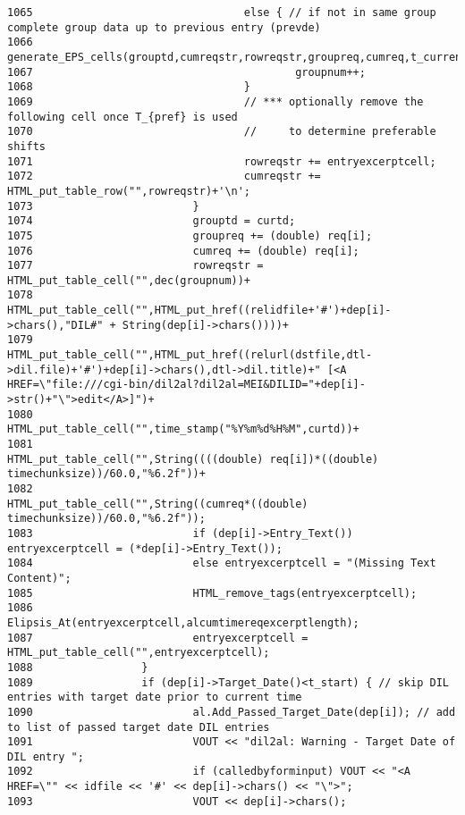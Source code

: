 \begin{verbatim}
1065                                 else { // if not in same group complete group data up to previous entry (prevde)
1066                                         generate_EPS_cells(grouptd,cumreqstr,rowreqstr,groupreq,cumreq,t_current,*prevde);
1067                                         groupnum++;
1068                                 }
1069                                 // *** optionally remove the following cell once T_{pref} is used
1070                                 //     to determine preferable shifts
1071                                 rowreqstr += entryexcerptcell;
1072                                 cumreqstr += HTML_put_table_row("",rowreqstr)+'\n';
1073                         }
1074                         grouptd = curtd;
1075                         groupreq += (double) req[i];
1076                         cumreq += (double) req[i];
1077                         rowreqstr = HTML_put_table_cell("",dec(groupnum))+
1078                                           HTML_put_table_cell("",HTML_put_href((relidfile+'#')+dep[i]->chars(),"DIL#" + String(dep[i]->chars())))+
1079                                           HTML_put_table_cell("",HTML_put_href((relurl(dstfile,dtl->dil.file)+'#')+dep[i]->chars(),dtl->dil.title)+" [<A HREF=\"file:///cgi-bin/dil2al?dil2al=MEI&DILID="+dep[i]->str()+"\">edit</A>]")+
1080                                           HTML_put_table_cell("",time_stamp("%Y%m%d%H%M",curtd))+
1081                                           HTML_put_table_cell("",String((((double) req[i])*((double) timechunksize))/60.0,"%6.2f"))+
1082                                           HTML_put_table_cell("",String((cumreq*((double) timechunksize))/60.0,"%6.2f"));
1083                         if (dep[i]->Entry_Text()) entryexcerptcell = (*dep[i]->Entry_Text());
1084                         else entryexcerptcell = "(Missing Text Content)";
1085                         HTML_remove_tags(entryexcerptcell);
1086                         Elipsis_At(entryexcerptcell,alcumtimereqexcerptlength);
1087                         entryexcerptcell = HTML_put_table_cell("",entryexcerptcell);
1088                 }
1089                 if (dep[i]->Target_Date()<t_start) { // skip DIL entries with target date prior to current time
1090                         al.Add_Passed_Target_Date(dep[i]); // add to list of passed target date DIL entries
1091                         VOUT << "dil2al: Warning - Target Date of DIL entry ";
1092                         if (calledbyforminput) VOUT << "<A HREF=\"" << idfile << '#' << dep[i]->chars() << "\">";
1093                         VOUT << dep[i]->chars();

\end{verbatim}
